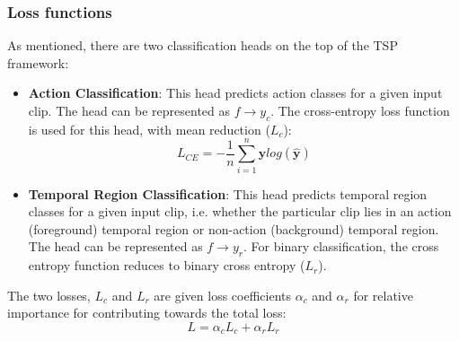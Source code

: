 \subsubsection{Loss functions} As mentioned, there are two classification heads on the top of the TSP framework:
\begin{itemize}
	\item \textbf{Action Classification}: This head predicts action classes for a given input clip. The head can be represented as $f \rightarrow y_c$. The cross-entropy loss function is used for this head, with mean reduction ($L_c$):
$$ L_{CE} = -\frac{1}{n} \sum_{i=1}^{n}{\textbf{y}log(\hat{\textbf{y}})} $$
	\item \textbf{Temporal Region Classification}: This head predicts temporal region classes for a given input clip, i.e. whether the particular clip lies in an action (foreground) temporal region or non-action (background) temporal region. The head can be represented as $f \rightarrow y_r$. For binary classification, the cross entropy function reduces to binary cross entropy ($L_r$).
\end{itemize}
\par The two losses, $L_c$ and $L_r$ are given loss coefficients $\alpha_c$ and $\alpha_r$ for relative importance for contributing towards the total loss:
$$ L = \alpha_c L_c + \alpha_r L_r $$



